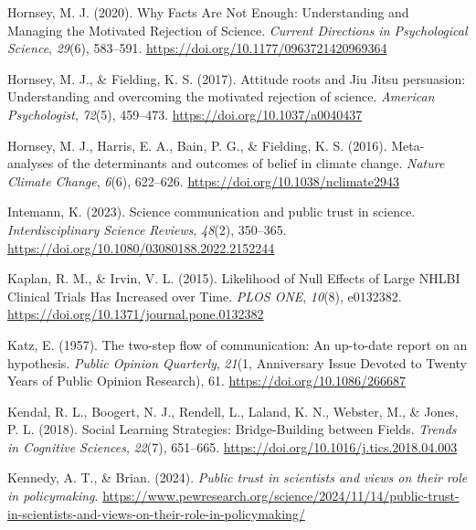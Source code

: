 \documentclass[
  jou,
  floatsintext,
  longtable,
  nolmodern,
  notxfonts,
  notimes,
  colorlinks=true,linkcolor=blue,citecolor=blue,urlcolor=blue]{apa7}
\newlength{\cslhangindent}
\newenvironment{CSLReferences}[2] %
 {\begin{list}{}{%
  \setlength{\itemindent}{0pt}
  \setlength{\leftmargin}{0pt}
  \setlength{\parsep}{0pt}
  \ifodd #1
   \setlength{\leftmargin}{\cslhangindent}
   \setlength{\itemindent}{-1\cslhangindent}
  \fi
  \setlength{\itemsep}{#2\baselineskip}}}
 {\end{list}}
\begin{document}
\begin{CSLReferences}{1}{0}
Hornsey, M. J. (2020). Why Facts Are Not Enough: Understanding and
Managing the Motivated Rejection of Science. \emph{Current Directions in
Psychological Science}, \emph{29}(6), 583--591.
\url{https://doi.org/10.1177/0963721420969364}

Hornsey, M. J., \& Fielding, K. S. (2017). Attitude roots and Jiu Jitsu
persuasion: Understanding and overcoming the motivated rejection of
science. \emph{American Psychologist}, \emph{72}(5), 459--473.
\url{https://doi.org/10.1037/a0040437}

Hornsey, M. J., Harris, E. A., Bain, P. G., \& Fielding, K. S. (2016).
Meta-analyses of the determinants and outcomes of belief in climate
change. \emph{Nature Climate Change}, \emph{6}(6), 622--626.
\url{https://doi.org/10.1038/nclimate2943}

Intemann, K. (2023). Science communication and public trust in science.
\emph{Interdisciplinary Science Reviews}, \emph{48}(2), 350--365.
\url{https://doi.org/10.1080/03080188.2022.2152244}

Kaplan, R. M., \& Irvin, V. L. (2015). Likelihood of Null Effects of
Large NHLBI Clinical Trials Has Increased over Time. \emph{PLOS ONE},
\emph{10}(8), e0132382.
\url{https://doi.org/10.1371/journal.pone.0132382}

Katz, E. (1957). The two-step flow of communication: An up-to-date
report on an hypothesis. \emph{Public Opinion Quarterly}, \emph{21}(1,
Anniversary Issue Devoted to Twenty Years of Public Opinion Research),
61. \url{https://doi.org/10.1086/266687}

Kendal, R. L., Boogert, N. J., Rendell, L., Laland, K. N., Webster, M.,
\& Jones, P. L. (2018). Social Learning Strategies: Bridge-Building
between Fields. \emph{Trends in Cognitive Sciences}, \emph{22}(7),
651--665. \url{https://doi.org/10.1016/j.tics.2018.04.003}

Kennedy, A. T., \& Brian. (2024). \emph{Public trust in scientists and
views on their role in policymaking}.
\url{https://www.pewresearch.org/science/2024/11/14/public-trust-in-scientists-and-views-on-their-role-in-policymaking/}


\end{CSLReferences}
\end{document}
